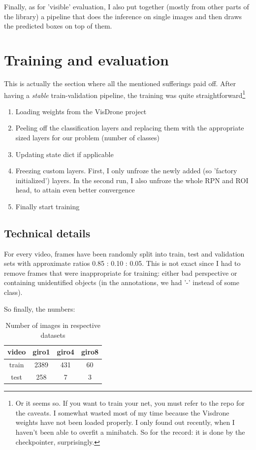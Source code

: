 \documentclass{article}
\begin{document}
Finally, as for 'visible' evaluation, I also put together (mostly from other parts of the library) a pipeline that does the inference on single images and then draws the predicted boxes on top of them. 

\section{Training and evaluation}

This is actually the section where all the mentioned sufferings paid off. After having a \textit{stable} train-validation pipeline, the training was quite straightforward\footnote{Or it seems so. If you want to train your net, you must refer to the repo for the caveats. I somewhat wasted most of my time because the Visdrone weights have not been loaded properly. I only found out recently, when I haven't been able to overfit a minibatch. So for the record: it is done by the checkpointer, surprisingly.}

\begin{enumerate}
    \item Loading weights from the VisDrone project
    \item Peeling off the classification layers and replacing them with the appropriate sized layers for our problem (number of classes)
    \item Updating state dict if applicable
    \item Freezing custom layers. First, I only unfroze the newly added (so 'factory initialized') layers. In the second run, I also unfroze the whole RPN and ROI head, to attain even better convergence 
    \item Finally start training 
\end{enumerate}

\subsection{Technical details}

For every video, frames have been randomly split into train, test and validation sets with approximate ratios 0.85 : 0.10 : 0.05. This is not exact since I had to remove frames that were inappropriate for training: either bad perspective or containing unidentified objects (in the annotations, we had '-' instead of some class). 

So finally, the numbers:

\begin{table}[h]
    \centering
    \begin{tabular}{|c|c|c|c|} \hline
       video  & \textbf{giro1} & \textbf{giro4} & \textbf{giro8} \\ \hline
        train  & 2389 & 431 & 60 \\ \hline
        test &  258 & 7 & 3 \\ \hline
        \end{tabular}
        \vspace{10pt}
    \caption{Number of images in respective datasets}
    \label{tab:data}
\end{table}
\end{document}
